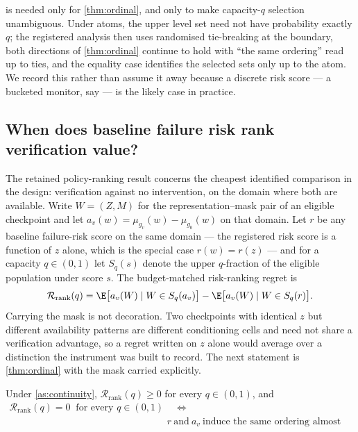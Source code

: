  is needed only for \cref{thm:ordinal}, and only to make
capacity-$q$ selection unambiguous.  Under atoms, the upper level set need not
have probability exactly $q$; the registered analysis then uses randomised
tie-breaking at the boundary, both directions of \cref{thm:ordinal} continue to
hold with ``the same ordering'' read up to ties, and the equality case
identifies the selected sets only up to the atom.  We record this rather than
assume it away because a discrete risk score --- a bucketed monitor, say --- is
the likely case in practice.

\subsection{When does baseline failure risk rank verification value?}

The retained policy-ranking result concerns the cheapest identified comparison in the design:
verification against no intervention, on the domain where both are available.
Write $W=(Z,M)$ for the representation--mask pair of an eligible checkpoint and
let $a_v(w)=\mu_{g_v}(w)-\mu_{g_0}(w)$ on that domain.  Let $r$ be any baseline
failure-risk score on the same domain --- the registered risk score is a
function of $z$ alone, which is the special case $r(w)=r(z)$ --- and for a
capacity $q\in(0,1)$ let $S_q(s)$ denote the upper $q$-fraction of the eligible
population under score $s$.  The budget-matched risk-ranking regret is
\begin{equation}
 \mathcal R_{\mathrm{rank}}(q)
 =\E\big[a_v(W)\mid W\in S_q(a_v)\big]-\E\big[a_v(W)\mid W\in S_q(r)\big].
 \label{eq:rank-regret}
\end{equation}
Carrying the mask is not decoration.  Two checkpoints with identical $z$ but
different availability patterns are different conditioning cells and need not
share a verification advantage, so a regret written on $z$ alone would average
over a distinction the instrument was built to record.  The next statement is
\cref{thm:ordinal} with the mask carried explicitly.

\begin{theorem}
\label{thm:ordinal}
Under \cref{as:continuity}, $\mathcal R_{\mathrm{rank}}(q)\ge0$ for every $q\in(0,1)$, and
\begin{equation}
 \begin{aligned}
 \mathcal R_{\mathrm{rank}}(q)=0\ \text{ for every }q\in(0,1)
 &\quad\Longleftrightarrow\quad\\[-2pt]
 &r\ \text{and}\ a_v\ \text{induce the same ordering almost everywhere.}
 \end{aligned}
\end{equation}
\end{theorem}

